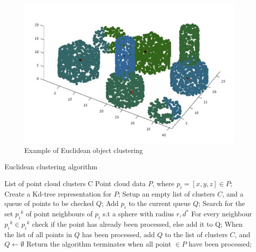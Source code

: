 \begin{figure}[h]
    \centering
    \includegraphics[scale=0.5]{figures/chap3_fig/euclidean/euclidean_example.jpg}
    \caption{Example of Euclidean object clustering  \cite{rusu_thesis}}
    \label{Chap3:Fig5}
\end{figure}


\begin{algorithm}[h]
    \caption{Euclidean clustering algorithm  \cite{rusu_thesis,cnn_uav}}
    \label{Chap3:Alg2}
    \begin{algorithmic}[1]
        \Ensure List of point cloud clusters C
        \Require Point cloud data $P$, where $p_i=[x,y,z] \in P$;
        \State Create a Kd-tree representation for $P$;
        \State Setup an empty list of clusters $C$, and a queue of points to be checked $Q$;
        \State Add $p_i$ to the current queue $Q$;
        \State Search for the set ${p_i}^k$ of point neighbours of $p_i$ s.t a sphere with radius $r,d^*$
        \State For every neighbour ${p_i}^k \in {p_i}^k$ check if the point has already been processed, else add it to Q;
        \EndFor
        \State When the list of all points in $Q$ has been processed, add $Q$ to the list of clusters $C$, and $Q \gets \emptyset$
        \EndFor
        \State Return the algorithm terminates when all point $\in P$ have been processed;
    \end{algorithmic}
\end{algorithm}

